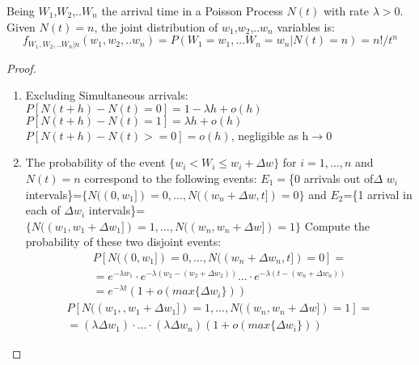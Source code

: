 \begin{theorem}
	Being $W_{1}$,$W_{2}$,..$W_{n}$ the arrival time in a Poisson Process $N(t)$ with rate ${\lambda}>0$. Given $N(t)=n$, the joint distribution of $w_{1}$,$w_{2}$,..$w_{n}$ variables is:
	\begin{equation}
	f_{W_1,W_2,..W_n|n} (w_1,w_2,..w_n) = P (W_1=w_1,...W_n=w_n|N(t)=n) = n!/t^n
	\end{equation}
	\begin{proof}
		\begin{enumerate}
			\item Excluding Simultaneous arrivals: \newline
		$	P[N(t+h)-N(t)=0]= 1 - \lambda h+ o(h)$ \newline
		$    P[N(t+h)-N(t)=1]= \lambda h+ o(h)$     \newline
		$    P[N(t+h)-N(t)>=0]= o(h)$, negligible as h$\rightarrow$0  \newline
		\item
	 The probability of the event $ \{w_i<W_i \leq w_i+\Delta w \}$ for $i=1,...,n$ and $N(t)=n$
	  correspond to the following events:
	  \newline $E_1=$\{0 arrivals out of$\Delta$ $w_i$ intervals\}=$\{N((0,w_1])=0,...,N((w_n+\Delta w,t])=0 \} $
	  \newline and
	  \newline $E_2$=\{1 arrival in each of $\Delta$$w_i$ intervals\}=$\{N((w_1,w_1+\Delta w_1])=1,...,N((w_n,w_n+\Delta w])=1\}$
	 \newline Compute the probability of these two disjoint events:
	  \begin{equation}
	  \begin{split}
	  P[N((0,w_1])=0,...,N((w_n+\Delta w_n,t])=0] =\\
	 = e^{-\lambda w_1} \cdot e^{-\lambda (w_2-(w_2+\Delta w_2))} ... \cdot e^{-\lambda (t-(w_n+\Delta w_n))}\\
	  =e^{-\lambda t} (1+o(max\{\Delta w_i\}))
	  \end{split}
       \end{equation}
       \newline
       \begin{equation}
      \begin{split}
     	P[N((w_1,,w_1+\Delta w_1])=1,...,N((w_n,w_n+\Delta w])=1] =\\
        = (\lambda \Delta w_1) \cdot ... \cdot(\lambda \Delta w_n) (1+o(max\{\Delta w_i\}))
      \end{split}

\end{equation}$$
\end{enumerate}
\end{proof}
\end{theorem}
